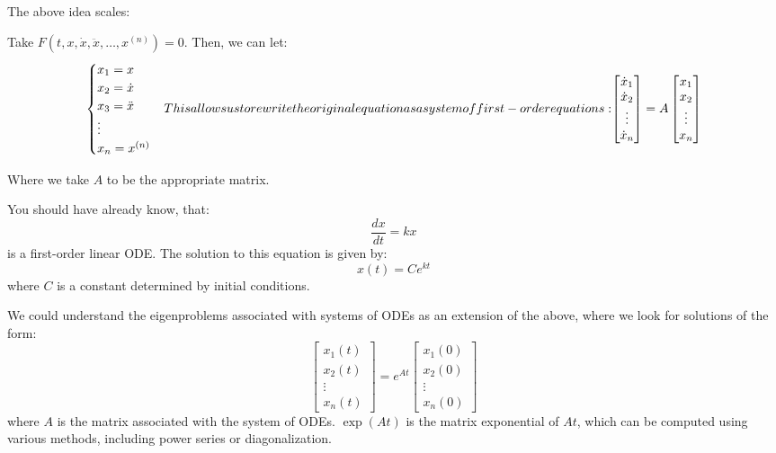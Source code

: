 \documentclass[11pt]{article}
\begin{document}
The above idea scales:

\begin{example}
    Take $F(t, x, \dot{x}, \ddot{x}, \ldots, x^{(n)}) = 0$. Then, we can let:
   \begin{equation}
    \begin{cases}
        x_1 = x \\
        x_2 = \dot{x} \\
        x_3 = \ddot{x} \\
        \vdots \\
        x_n = x^{(n)}
    \end{cases}
    $$
    This allows us to rewrite the original equation as a system of first-order equations:
    $$ 
    \begin{bmatrix}
        \dot{x}_1 \\
        \dot{x}_2 \\
        \vdots \\
        \dot{x}_n
    \end{bmatrix}
    =
    A
    \begin{bmatrix}
        x_1 \\
        x_2 \\
        \vdots \\
        x_n
    \end{bmatrix}
\end{equation}

Where we take $A$ to be the appropriate matrix.
\end{example}

\begin{example}
    You should have already know, that:
    $$
    \frac{dx}{dt} = kx
    $$
    is a first-order linear ODE. The solution to this equation is given by:
    $$
    x(t) = Ce^{kt}
    $$
    where \( C \) is a constant determined by initial conditions.

We could understand the eigenproblems associated with systems of ODEs as an extension of the above, where we look for solutions of the form:
\begin{equation}
\begin{bmatrix}
x_1(t) \\
x_2(t) \\
\vdots \\
x_n(t)
\end{bmatrix}
=
e^{At}
\begin{bmatrix}
x_1(0) \\
x_2(0) \\
\vdots \\
x_n(0)
\end{bmatrix}
\end{equation}
where \( A \) is the matrix associated with the system of ODEs. $\exp(At)$ is the matrix exponential of \( At \), which can be computed using various methods, including power series or diagonalization.
\end{example}
\end{document}
